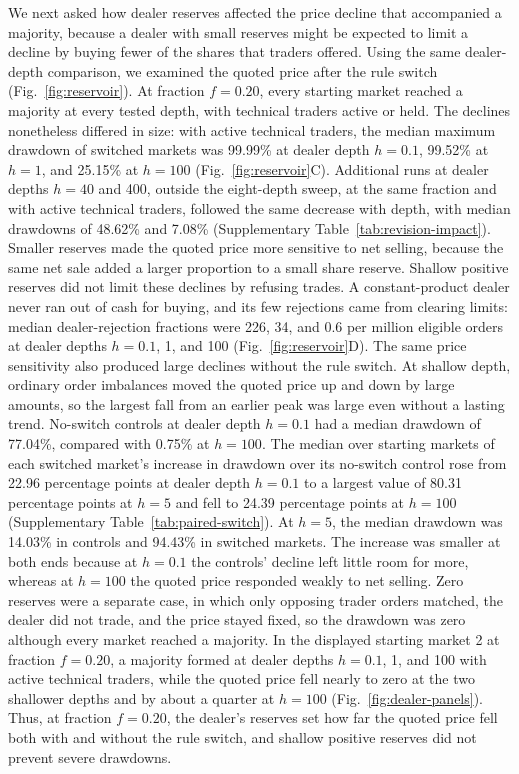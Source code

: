 We next asked how dealer reserves affected the price decline that
accompanied a majority, because a dealer with small reserves might be
expected to limit a decline by buying fewer of the shares that traders
offered. Using the same dealer-depth comparison, we examined the quoted
price after the rule switch (Fig.~\ref{fig:reservoir}). At fraction
$f=0.20$, every starting market reached a majority at every tested
depth, with technical traders active or held. The declines
nonetheless differed in size: with active technical traders, the median maximum drawdown of switched
markets was 99.99\% at dealer depth $h=0.1$, 99.52\% at $h=1$, and
25.15\% at $h=100$ (Fig.~\ref{fig:reservoir}C). Additional runs
at dealer depths $h=40$ and 400, outside the eight-depth sweep, at the
same fraction and with active technical traders, followed the same
decrease with depth, with median drawdowns of 48.62\% and 7.08\%
(Supplementary Table~\ref{tab:revision-impact}). Smaller
reserves made the quoted price more sensitive to net selling, because
the same net sale added a larger proportion to a small share reserve.
Shallow positive reserves did not limit these declines by refusing
trades. A constant-product dealer never ran out of cash for buying, and
its few rejections came from clearing limits: median dealer-rejection
fractions were 226, 34, and 0.6 per million eligible orders at dealer
depths $h=0.1$, 1, and 100 (Fig.~\ref{fig:reservoir}D).
The same price sensitivity also produced large declines without the
rule switch.
At shallow depth, ordinary order imbalances moved the quoted price up and
down by large amounts, so the largest fall from an earlier peak was large
even without a lasting trend.
No-switch controls at dealer depth $h=0.1$ had a median drawdown of
77.04\%, compared with 0.75\% at $h=100$. The median over starting markets of each switched market's increase in
drawdown over its no-switch control rose from 22.96 percentage points at
dealer depth $h=0.1$ to a largest value of 80.31 percentage points at
$h=5$ and fell to 24.39 percentage points at $h=100$ (Supplementary
Table~\ref{tab:paired-switch}). At $h=5$, the median drawdown was
14.03\% in controls and 94.43\% in switched markets.
The increase was smaller at both ends because at $h=0.1$ the controls'
decline left little room for more, whereas at $h=100$ the quoted price
responded weakly to net selling. Zero reserves were a separate case, in which only opposing trader orders
matched, the dealer did not trade, and the price stayed fixed, so the
drawdown was zero although every market reached a majority. In the
displayed starting market 2 at fraction $f=0.20$, a majority formed at
dealer depths $h=0.1$, 1, and 100 with active technical traders, while
the quoted price fell nearly to zero at the two shallower depths and by
about a quarter at $h=100$ (Fig.~\ref{fig:dealer-panels}). Thus, at
fraction $f=0.20$, the dealer's reserves set how far the quoted price
fell both with and without the rule switch, and shallow positive
reserves did not prevent severe drawdowns.

